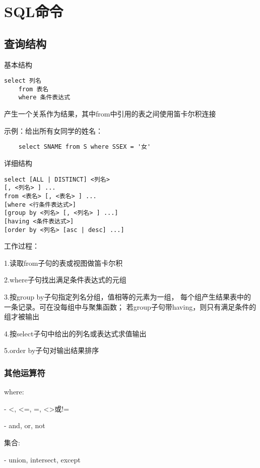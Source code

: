 \documentclass{article}        %
\begin{document}
 
\section{SQL命令}

\subsection{查询结构}

基本结构

\begin{verbatim}
select 列名
    from 表名
    where 条件表达式
\end{verbatim}

产生一个关系作为结果，其中from中引用的表之间使用笛卡尔积连接

示例：给出所有女同学的姓名：

\begin{verbatim}
    select SNAME from S where SSEX = '女'
\end{verbatim}

详细结构
\begin{verbatim}
select [ALL | DISTINCT] <列名>
[, <列名> ] ...
from <表名> [, <表名> ] ...
[where <行条件表达式>]
[group by <列名> [, <列名> ] ...]
[having <条件表达式>]
[order by <列名> [asc | desc] ...]
\end{verbatim}

工作过程：

1.读取from子句的表或视图做笛卡尔积

2.where子句找出满足条件表达式的元组

3.按group by子句指定列名分组，值相等的元素为一组，
每个组产生结果表中的一条记录。可在没每组中与聚集函数；
若group子句带having，则只有满足条件的组才被输出

4.按select子句中给出的列名或表达式求值输出

5.order by子句对输出结果排序

\subsubsection{其他运算符}

where: 

- <, <=, =, <>或!=

- and, or, not

集合:

- union, intersect, except
\end{document}
